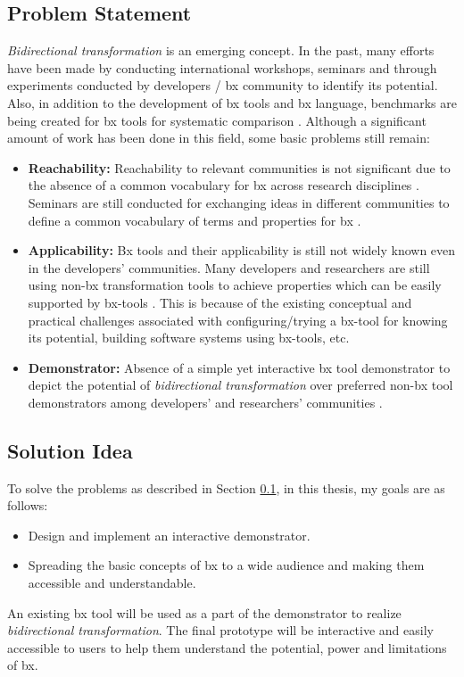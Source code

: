 \subsection{Problem Statement}\label{subsec:probstmt}
\textit{Bidirectional transformation} is an emerging concept. In the past, many efforts have been made by conducting international workshops, seminars and through experiments conducted by developers / bx community to identify its potential. Also, in addition to the development of bx tools and bx language, benchmarks are being created for bx tools for systematic comparison \cite{benchmark-BX}.
\newline\newline  Although a significant amount of work has been done in this field, some basic problems still remain:
\begin{itemize}
	\item {\textbf{Reachability: } Reachability to relevant communities is not significant due to the absence of a common vocabulary for bx across research disciplines \cite{bx-theoryandappl}. Seminars are still conducted for exchanging ideas in different communities to define a common vocabulary of terms and properties for bx \cite{bx-dagstuhl}.}	
	\item {\textbf{Applicability: } Bx tools and their applicability is still not widely known even in the developers' communities. Many developers and researchers are still using non-bx transformation tools to achieve properties which can be easily supported by bx-tools \cite{bx-theoryandappl}. This is because of the existing conceptual and practical challenges associated with configuring/trying a bx-tool for knowing its potential, building software systems using bx-tools, etc.}
	\item {\textbf{Demonstrator: } Absence of a simple yet interactive bx tool demonstrator to depict the potential of \textit{bidirectional transformation} over preferred non-bx tool demonstrators among developers' and researchers' communities \cite{bx-theoryandappl}.}
\end{itemize}

\subsection{Solution Idea}\label{subsec:solution}
To solve the problems as described in Section \ref{subsec:probstmt}, in this thesis, my goals are as follows:
\begin{itemize} 
\item {Design and implement an interactive demonstrator.} 
\item {Spreading the basic concepts of bx to a wide audience and making them accessible and understandable.}
\end{itemize}
An existing bx tool will be used as a part of the demonstrator to realize \textit{bidirectional transformation}. The final prototype will be interactive and easily accessible to users to help them understand the potential, power and limitations of bx.

